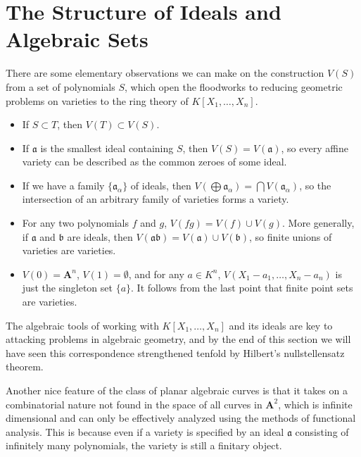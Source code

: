 \section{The Structure of Ideals and Algebraic Sets}

There are some elementary observations we can make on the construction $V(S)$ from a set of polynomials $S$, which open the floodworks to reducing geometric problems on varieties to the ring theory of $K[X_1, \dots, X_n]$.
%
\begin{itemize}
    \item If $S \subset T$, then $V(T) \subset V(S)$.

    \item If $\mathfrak{a}$ is the smallest ideal containing $S$, then $V(S) = V(\mathfrak{a})$, so every affine variety can be described as the common zeroes of some ideal.

    \item If we have a family $\{ \mathfrak{a}_\alpha \}$ of ideals, then $V(\bigoplus \mathfrak{a}_\alpha) = \bigcap V(\mathfrak{a}_\alpha)$, so the intersection of an arbitrary family of varieties forms a variety.

    \item For any two polynomials $f$ and $g$, $V(fg) = V(f) \cup V(g)$. More generally, if $\mathfrak{a}$ and $\mathfrak{b}$ are ideals, then $V(\mathfrak{a}\mathfrak{b}) = V(\mathfrak{a}) \cup V(\mathfrak{b})$, so finite unions of varieties are varieties.

    \item $V(0) = \mathbf{A}^n$, $V(1) = \emptyset$, and for any $a \in K^n$, $V(X_1-a_1,\dots,X_n - a_n)$ is just the singleton set $\{ a \}$. It follows from the last point that finite point sets are varieties.
\end{itemize}
%
The algebraic tools of working with $K[X_1, \dots, X_n]$ and its ideals are key to attacking problems in algebraic geometry, and by the end of this section we will have seen this correspondence strengthened tenfold by Hilbert's nullstellensatz theorem.

Another nice feature of the class of planar algebraic curves is that it takes on a combinatorial nature not found in the space of all curves in $\mathbf{A}^2$, which is infinite dimensional and can only be effectively analyzed using the methods of functional analysis. This is because even if a variety is specified by an ideal $\mathfrak{a}$ consisting of infinitely many polynomials, the variety is still a finitary object.

